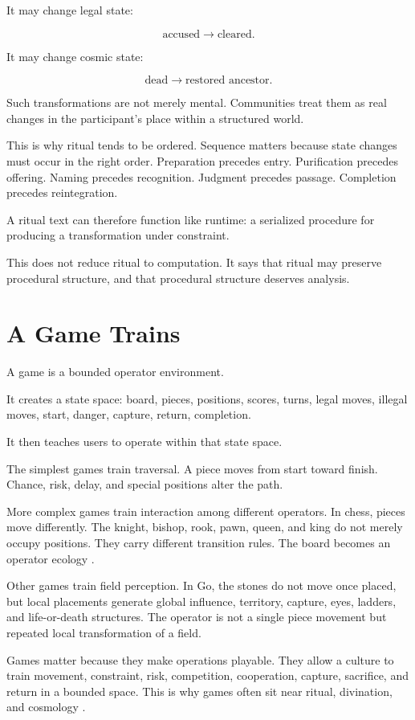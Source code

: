 \documentclass[11pt]{book}
\begin{document}
It may change legal state:

\[
\text{accused} \longrightarrow \text{cleared}.
\]

It may change cosmic state:

\[
\text{dead} \longrightarrow \text{restored ancestor}.
\]

Such transformations are not merely mental. Communities treat them as real changes in the participant's place within a structured world.

This is why ritual tends to be ordered. Sequence matters because state changes must occur in the right order. Preparation precedes entry. Purification precedes offering. Naming precedes recognition. Judgment precedes passage. Completion precedes reintegration.

A ritual text can therefore function like runtime: a serialized procedure for producing a transformation under constraint.

This does not reduce ritual to computation. It says that ritual may preserve procedural structure, and that procedural structure deserves analysis.

\section{A Game Trains}

A game is a bounded operator environment.

It creates a state space: board, pieces, positions, scores, turns, legal moves, illegal moves, start, danger, capture, return, completion.

It then teaches users to operate within that state space.

The simplest games train traversal. A piece moves from start toward finish. Chance, risk, delay, and special positions alter the path.

More complex games train interaction among different operators. In chess, pieces move differently. The knight, bishop, rook, pawn, queen, and king do not merely occupy positions. They carry different transition rules. The board becomes an operator ecology \cite{Murray1913Chess}.

Other games train field perception. In Go, the stones do not move once placed, but local placements generate global influence, territory, capture, eyes, ladders, and life-or-death structures. The operator is not a single piece movement but repeated local transformation of a field.

Games matter because they make operations playable. They allow a culture to train movement, constraint, risk, competition, cooperation, capture, sacrifice, and return in a bounded space. This is why games often sit near ritual, divination, and cosmology \cite{Murray1952BoardGames,Finkel2007AncientBoardGames,Bell1969BoardTableGames}.
\end{document}
